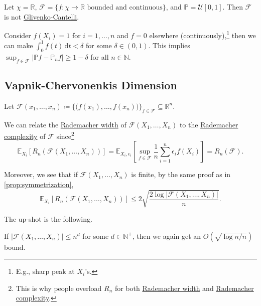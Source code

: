\begin{eg}
	Let \(\chi = \mathbb{R} \), \(\mathscr{F} = \{ f\colon \chi \to \mathbb{R} \text{ bounded and continuous}\} \), and \(\mathbb{P} = \mathcal{U} [0, 1]\). Then \(\mathscr{F} \) is not \hyperref[def:Glivenko-Cantelli]{Glivenko-Cantelli}.
\end{eg}
\begin{explanation}
	Consider \(f(X_i) = 1\) for \(i = 1, \dots , n\) and \(f = 0\) elsewhere (continuously),\footnote{E.g., sharp peak at \(X_i\)'s.} then we can make \(\int_{0}^{1} f(t) \,\mathrm{d}t < \delta \) for some \(\delta \in (0, 1)\). This implies \(\sup _{f\in \mathscr{F} } \vert \mathbb{P} f - \mathbb{P} _n f \vert \geq 1 - \delta  \) for all \(n \in \mathbb{N} \).
\end{explanation}

\subsection{Vapnik-Chervonenkis Dimension}
\begin{notation}
	Let \(\mathscr{F} (x_1, \dots , x_n) \coloneqq \{ \big(f(x_1), \dots , f(x_n)\big) \} _{f\in \mathscr{F} } \subseteq \mathbb{R} ^n\).
\end{notation}

We can relate the \hyperref[def:Rademacher-width]{Rademacher width} of \(\mathscr{F} (X_1, \dots , X_n)\) to the \hyperref[def:Rademacher-complexity]{Rademacher complexity} of \(\mathscr{F} \) since\footnote{This is why people overload \(R_n\) for both \hyperref[def:Rademacher-width]{Rademacher width} and \hyperref[def:Rademacher-complexity]{Rademacher complexity}.}
\[
	\mathbb{E}_{X_i}\left[R_n( \mathscr{F} (X_1, \dots , X_n)) \right]
	= \mathbb{E}_{X_i, \epsilon _i}\left[ \sup _{f\in \mathscr{F} }\frac{1}{n}\sum_{i=1}^{n} \epsilon _i f(X_i) \right]
	= R_n(\mathscr{F} ).
\]

Moreover, we see that if \(\mathscr{F} (X_1, \dots , X_n)\) is finite, by the same proof as in \autoref{prop:symmetrization},
\[
	\mathbb{E}_{X_i}\left[R_n(\mathscr{F} (X_1, \dots , X_n)) \right]
	\leq 2 \sqrt{\frac{2 \log \vert \mathscr{F} (X_1, \dots , X_n) \vert }{n}} .
\]

The up-shot is the following.

\begin{remark}
	If \(\vert \mathscr{F} (X_1, \dots , X_n) \vert \leq n^d\) for some \(d\in \mathbb{N}^+ \), then we again get an \(O(\sqrt{\log n / n} )\) bound.
\end{remark}

